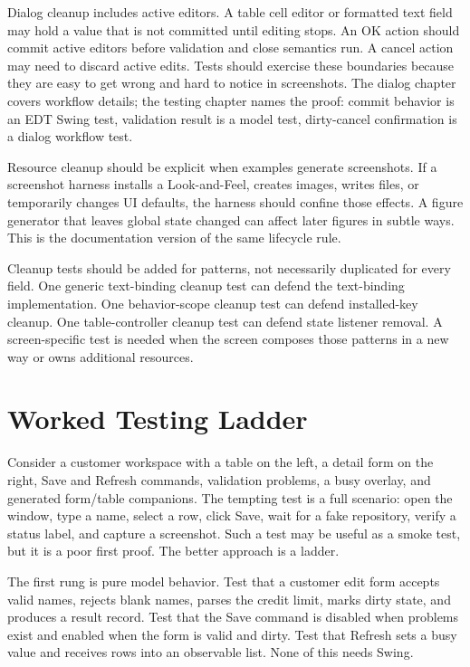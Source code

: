 Dialog cleanup includes active editors. A table cell editor or formatted text field may hold a value that is not committed until editing stops. An OK action should commit active editors before validation and close semantics run. A cancel action may need to discard active edits. Tests should exercise these boundaries because they are easy to get wrong and hard to notice in screenshots. The dialog chapter covers workflow details; the testing chapter names the proof: commit behavior is an EDT Swing test, validation result is a model test, dirty-cancel confirmation is a dialog workflow test.

Resource cleanup should be explicit when examples generate screenshots. If a screenshot harness installs a Look-and-Feel, creates images, writes files, or temporarily changes UI defaults, the harness should confine those effects. A figure generator that leaves global state changed can affect later figures in subtle ways. This is the documentation version of the same lifecycle rule.

Cleanup tests should be added for patterns, not necessarily duplicated for every field. One generic text-binding cleanup test can defend the text-binding implementation. One behavior-scope cleanup test can defend installed-key cleanup. One table-controller cleanup test can defend state listener removal. A screen-specific test is needed when the screen composes those patterns in a new way or owns additional resources.

\section{Worked Testing Ladder}

Consider a customer workspace with a table on the left, a detail form on the right, Save and Refresh commands, validation problems, a busy overlay, and generated form/table companions. The tempting test is a full scenario: open the window, type a name, select a row, click Save, wait for a fake repository, verify a status label, and capture a screenshot. Such a test may be useful as a smoke test, but it is a poor first proof. The better approach is a ladder.

The first rung is pure model behavior. Test that a customer edit form accepts valid names, rejects blank names, parses the credit limit, marks dirty state, and produces a result record. Test that the Save command is disabled when problems exist and enabled when the form is valid and dirty. Test that Refresh sets a busy value and receives rows into an observable list. None of this needs Swing.

